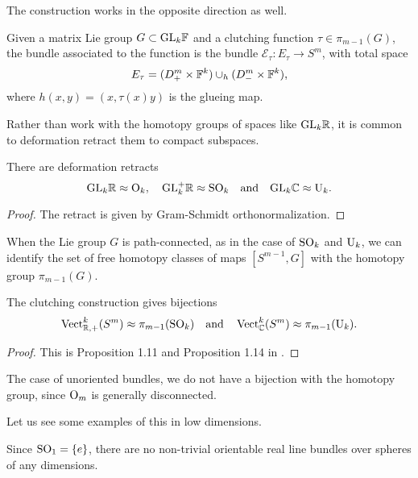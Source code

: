 The construction works in the opposite direction as well.

\begin{definition}
	Given a matrix Lie group $G\subset \mathrm{GL}_k\mathbb{F}$ and a clutching function $\tau\in \pi_{m-1}(G)$, the bundle associated to the function is the bundle $\mathcal{E}_\tau : E_\tau \to S^{m}$, with total space
	\[
		E_\tau = (D_+^m\times \mathbb{F}^k)\cup_h (D_-^{m}\times \mathbb{F}^k),
	\]
	where $h(x,y)=(x,\tau(x)y)$ is the glueing map.
\end{definition}

Rather than work with the homotopy groups of spaces like $\mathrm{GL}_k\mathbb{R}$, it is common to deformation retract them to compact subspaces.

\begin{proposition}
	There are deformation retracts
	\[
		\mathrm{GL}_k\mathbb{R} \approx \mathrm{O}_k,\quad \mathrm{GL}_k^+\mathbb{R} \approx \mathrm{SO}_k\quad\textrm{and}\quad \mathrm{GL}_k\mathbb{C} \approx \mathrm{U}_k.
	\]
\end{proposition}
\begin{proof}
	The retract is given by Gram-Schmidt orthonormalization.
\end{proof}

When the Lie group $G$ is path-connected, as in the case of $\mathrm{SO}_k$ and $\mathrm{U}_k$, we can identify the set of free homotopy classes of maps $[S^{m-1}, G]$ with the homotopy group $\pi_{m-1}(G)$.

\begin{theorem}
	The clutching construction gives bijections
	\[
			\operatorname{Vect}_{\mathbb{R},+}^k(S^m) \approx \pi_{m-1}(\mathrm{SO}_k)\quad\textrm{and}\quad
			\operatorname{Vect}_{\mathbb{C}}^k(S^m) \approx \pi_{m-1}(\mathrm{U}_k).
	\]
\end{theorem}
\begin{proof}
	This is Proposition 1.11 and Proposition 1.14 in \cite{hatcher2003ktheory}.
\end{proof}

\begin{remark} 
	The case of unoriented bundles, we do not have a bijection with the homotopy group, since $\mathrm{O}_m$ is generally disconnected.
\end{remark}

Let us see some examples of this in low dimensions.

\begin{example}
	Since $\mathrm{SO}_1 = \{e\}$, there are no non-trivial orientable real line bundles over spheres of any dimensions.
\end{example}

